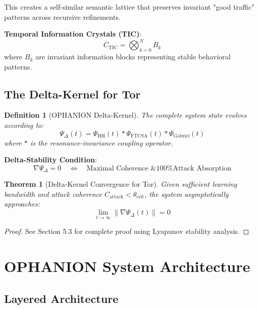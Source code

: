 \documentclass[11pt,a4paper]{article}
\newtheorem{theorem}{Theorem}[section]
\newtheorem{definition}{Definition}[section]
\begin{document}
This creates a self-similar semantic lattice that preserves invariant "good traffic" patterns across recursive refinements.

\textbf{Temporal Information Crystals (TIC)}:
\begin{equation}
C_{\text{TIC}} = \bigotimes_{k=0}^{N} B_k
\end{equation}
where $B_k$ are invariant information blocks representing stable behavioral patterns.

\subsection{The Delta-Kernel for Tor}

\begin{definition}[OPHANION Delta-Kernel]
The complete system state evolves according to:
\begin{equation}
\Psi_\Delta(t) = \Psi_{\text{HH}}(t) * \Psi_{\text{FTCSA}}(t) * \Psi_{\text{Gabriel}}(t)
\end{equation}
where $*$ is the resonance-invariance coupling operator.
\end{definition}

\textbf{Delta-Stability Condition}:
\begin{equation}
\nabla \Psi_\Delta = 0 \quad \Leftrightarrow \quad \text{Maximal Coherence \& 100\% Attack Absorption}
\end{equation}

\begin{theorem}[Delta-Kernel Convergence for Tor]
Given sufficient learning bandwidth and attack coherence $C_{\text{attack}} < \theta_{\text{crit}}$, the system asymptotically approaches:
\begin{equation}
\lim_{t \to \infty} \|\nabla \Psi_\Delta(t)\| = 0
\end{equation}
\end{theorem}

\begin{proof}
See Section 5.3 for complete proof using Lyapunov stability analysis.
\end{proof}

\newpage
\section{OPHANION System Architecture}

\subsection{Layered Architecture}
\end{document}
